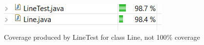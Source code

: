 \begin{figure}[p!]
    \begin{center}
        \includegraphics{img/testcoverage.png}
        \caption{Coverage produced by LineTest for class Line, not 100\% coverage}
        \label{fig:test_cov}
       \end{center}
\end{figure}
